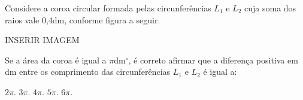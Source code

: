 \begin{question}%
Considere a coroa circular formada pelas circunferências \(L_1\) e \(L_2\) cuja soma dos raios vale 0,4dm, conforme figura a seguir.

INSERIR IMAGEM

Se a área da coroa é igual a \(\pi\)dm\(^\circ\), é correto afirmar que a diferença positiva em dm entre os comprimento das circunferências \(L_1\) e \(L_2\) é igual a:
    \begin{tasks}
        \task \(2\pi\).
        \task \(3\pi\).
        \task \(4\pi\).
        \task \(5\pi\).
        \task \(6\pi\).
    \end{tasks}
\end{question}
